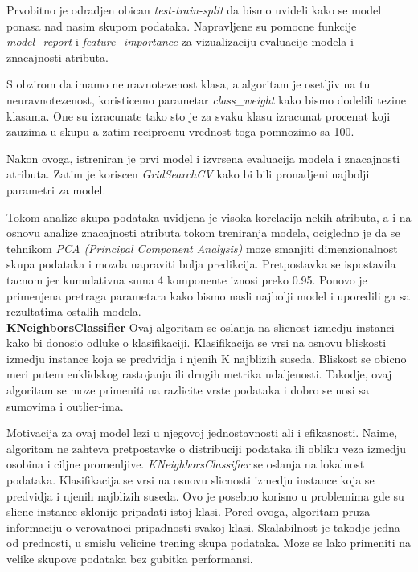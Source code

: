 \documentclass[10pt]{article}
\begin{document}
Prvobitno je odradjen obican \textit{test-train-split} da bismo uvideli kako se model ponasa nad nasim skupom podataka. Napravljene su pomocne funkcije \textit{model\_report} i \textit{feature\_importance} za vizualizaciju evaluacije modela i znacajnosti atributa. 

S obzirom da imamo neuravnotezenost klasa, a algoritam je osetljiv na tu neuravnotezenost, koristicemo parametar \textit{class\_weight} kako bismo dodelili tezine klasama. One su izracunate tako sto je za svaku klasu izracunat procenat koji zauzima u skupu a zatim reciprocnu vrednost toga pomnozimo sa 100.

Nakon ovoga, istreniran je prvi model i izvrsena evaluacija modela i znacajnosti atributa. Zatim je koriscen \textit{GridSearchCV} kako bi bili pronadjeni najbolji parametri za model.

Tokom analize skupa podataka uvidjena je visoka korelacija nekih atributa, a i na osnovu analize znacajnosti atributa tokom treniranja modela, ocigledno je da se tehnikom \textit{PCA (Principal Component Analysis)} moze smanjiti dimenzionalnost skupa podataka i mozda napraviti bolja predikcija. Pretpostavka se ispostavila tacnom jer kumulativna suma 4 komponente iznosi preko 0.95. Ponovo je primenjena pretraga parametara kako bismo nasli najbolji model i uporedili ga sa rezultatima ostalih modela.\\

\textbf{KNeighborsClassifier}
Ovaj algoritam se oslanja na slicnost izmedju instanci kako bi donosio odluke o klasifikaciji. Klasifikacija se vrsi na osnovu bliskosti izmedju instance koja se predvidja i njenih K najblizih suseda. Bliskost se obicno meri putem euklidskog rastojanja ili drugih metrika udaljenosti. Takodje, ovaj algoritam se moze primeniti na razlicite vrste podataka i dobro se nosi sa sumovima i outlier-ima.

Motivacija za ovaj model lezi u njegovoj jednostavnosti ali i efikasnosti. Naime, algoritam ne zahteva pretpostavke o distribuciji podataka ili obliku veza izmedju osobina i ciljne promenljive. \textit{KNeighborsClassifier} se oslanja na lokalnost podataka. Klasifikacija se vrsi na osnovu slicnosti izmedju instance koja se predvidja i njenih najblizih suseda. Ovo je posebno korisno u problemima gde su slicne instance sklonije pripadati istoj klasi. Pored ovoga, algoritam pruza informaciju o verovatnoci pripadnosti svakoj klasi. Skalabilnost je takodje jedna od prednosti, u smislu velicine trening skupa podataka. Moze se lako primeniti na velike skupove podataka bez gubitka performansi.\\
\end{document}
